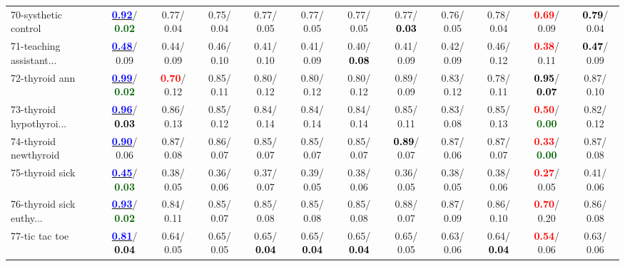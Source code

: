 \begin{table}[h]
\begin{center}
{\begin{tabular}{lc|c|c|c|c|c|c|c|c|c|c}
70-systhetic control & \underline{\textcolor{blue}{\textbf{  0.92}}}/\textcolor{darkgreen}{\textbf{  0.02}} &   0.77/  0.04 &   0.75/  0.04 &   0.77/  0.05 &   0.77/  0.05 &   0.77/  0.05 &   0.77/\textcolor{black}{\textbf{  0.03}} &   0.76/  0.05 &   0.78/  0.04 & \textcolor{red}{\textbf{  0.69}}/  0.09 & \textcolor{black}{\textbf{  0.79}}/  0.04 \\
71-teaching assistant... & \underline{\textcolor{blue}{\textbf{  0.48}}}/  0.09 &   0.44/  0.09 &   0.46/  0.10 &   0.41/  0.10 &   0.41/  0.09 &   0.40/\textcolor{black}{\textbf{  0.08}} &   0.41/  0.09 &   0.42/  0.09 &   0.46/  0.12 & \textcolor{red}{\textbf{  0.38}}/  0.11 & \textcolor{black}{\textbf{  0.47}}/  0.09 \\ \hline
72-thyroid ann & \underline{\textcolor{blue}{\textbf{  0.99}}}/\textcolor{darkgreen}{\textbf{  0.02}} & \textcolor{red}{\textbf{  0.70}}/  0.12 &   0.85/  0.11 &   0.80/  0.12 &   0.80/  0.12 &   0.80/  0.12 &   0.89/  0.09 &   0.83/  0.12 &   0.78/  0.11 & \textcolor{black}{\textbf{  0.95}}/\textcolor{black}{\textbf{  0.07}} &   0.87/  0.10 \\
73-thyroid hypothyroi... & \underline{\textcolor{blue}{\textbf{  0.96}}}/\textcolor{black}{\textbf{  0.03}} &   0.86/  0.13 &   0.85/  0.12 &   0.84/  0.14 &   0.84/  0.14 &   0.84/  0.14 &   0.85/  0.11 &   0.83/  0.08 &   0.85/  0.13 & \textcolor{red}{\textbf{  0.50}}/\textcolor{darkgreen}{\textbf{  0.00}} &   0.82/  0.12 \\
74-thyroid newthyroid & \underline{\textcolor{blue}{\textbf{  0.90}}}/  0.06 &   0.87/  0.08 &   0.86/  0.07 &   0.85/  0.07 &   0.85/  0.07 &   0.85/  0.07 & \textcolor{black}{\textbf{  0.89}}/  0.07 &   0.87/  0.06 &   0.87/  0.07 & \textcolor{red}{\textbf{  0.33}}/\textcolor{darkgreen}{\textbf{  0.00}} &   0.87/  0.08 \\
75-thyroid sick & \underline{\textcolor{blue}{\textbf{  0.45}}}/\textcolor{darkgreen}{\textbf{  0.03}} &   0.38/  0.05 &   0.36/  0.06 &   0.37/  0.07 &   0.39/  0.05 &   0.38/  0.06 &   0.36/  0.05 &   0.38/  0.05 &   0.38/  0.06 & \textcolor{red}{\textbf{  0.27}}/  0.05 &   0.41/  0.06 \\
76-thyroid sick euthy... & \underline{\textcolor{blue}{\textbf{  0.93}}}/\textcolor{darkgreen}{\textbf{  0.02}} &   0.84/  0.11 &   0.85/  0.07 &   0.85/  0.08 &   0.85/  0.08 &   0.85/  0.08 &   0.88/  0.07 &   0.87/  0.09 &   0.86/  0.10 & \textcolor{red}{\textbf{  0.70}}/  0.20 &   0.86/  0.08 \\
77-tic tac toe & \underline{\textcolor{blue}{\textbf{  0.81}}}/\textcolor{black}{\textbf{  0.04}} &   0.64/  0.05 &   0.65/  0.05 &   0.65/\textcolor{black}{\textbf{  0.04}} &   0.65/\textcolor{black}{\textbf{  0.04}} &   0.65/\textcolor{black}{\textbf{  0.04}} &   0.65/  0.05 &   0.63/  0.06 &   0.64/\textcolor{black}{\textbf{  0.04}} & \textcolor{red}{\textbf{  0.54}}/  0.06 &   0.63/  0.06 \\

\end{tabular}}
\end{center}
\end{table}
